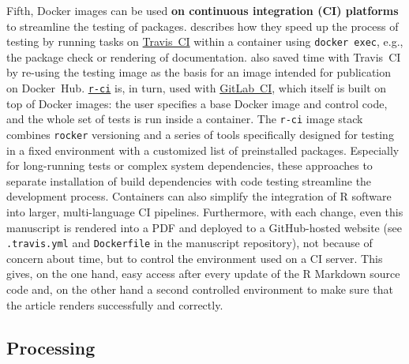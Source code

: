 \label{ci} Fifth, Docker images can be used \textbf{on continuous
integration (CI) platforms} to streamline the testing of packages.
\citet{ye_docker_2019} describes how they speed up the process of
testing by running tasks on \href{https://travis-ci.org/}{Travis~CI}
within a container using \texttt{docker\ exec}, e.g., the package check
or rendering of documentation. \citet{cardozo_faster_2018} also saved
time with Travis~CI by re-using the testing image as the basis for an
image intended for publication on Docker~Hub.
\href{https://github.com/ColinFay/r-ci}{\texttt{r-ci}} is, in turn, used
with \href{https://docs.gitlab.com/ee/ci/}{GitLab~CI}, which itself is
built on top of Docker images: the user specifies a base Docker image
and control code, and the whole set of tests is run inside a container.
The \texttt{r-ci} image stack combines \texttt{rocker} versioning and a
series of tools specifically designed for testing in a fixed environment
with a customized list of preinstalled packages. Especially for
long-running tests or complex system dependencies, these approaches to
separate installation of build dependencies with code testing streamline
the development process. Containers can also simplify the integration of
R software into larger, multi-language CI pipelines. Furthermore, with
each change, even this manuscript is rendered into a PDF and deployed to
a GitHub-hosted website (see \texttt{.travis.yml} and
\texttt{Dockerfile} in the manuscript repository), not because of
concern about time, but to control the environment used on a CI server.
This gives, on the one hand, easy access after every update of the R
Markdown source code and, on the other hand a second controlled
environment to make sure that the article renders successfully and
correctly.

\hypertarget{processing}{%
\subsection{Processing}\label{processing}}

